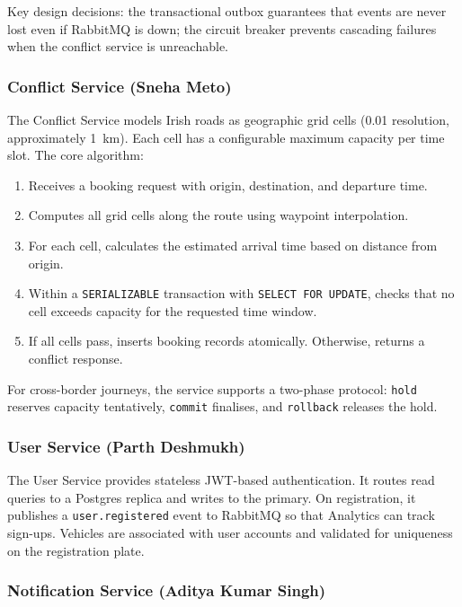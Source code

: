 \documentclass[12pt,a4paper]{article}
\begin{document}
Key design decisions: the transactional outbox guarantees that events are never lost even if RabbitMQ is down; the circuit breaker prevents cascading failures when the conflict service is unreachable.

\subsubsection{Conflict Service (Sneha Meto)}

The Conflict Service models Irish roads as geographic grid cells (0.01\textdegree{} resolution, approximately 1~km). Each cell has a configurable maximum capacity per time slot. The core algorithm:
\begin{enumerate}[nosep]
  \item Receives a booking request with origin, destination, and departure time.
  \item Computes all grid cells along the route using waypoint interpolation.
  \item For each cell, calculates the estimated arrival time based on distance from origin.
  \item Within a \texttt{SERIALIZABLE} transaction with \texttt{SELECT FOR UPDATE}, checks that no cell exceeds capacity for the requested time window.
  \item If all cells pass, inserts booking records atomically. Otherwise, returns a conflict response.
\end{enumerate}

For cross-border journeys, the service supports a two-phase protocol: \texttt{hold} reserves capacity tentatively, \texttt{commit} finalises, and \texttt{rollback} releases the hold.

\subsubsection{User Service (Parth Deshmukh)}

The User Service provides stateless JWT-based authentication. It routes read queries to a Postgres replica and writes to the primary. On registration, it publishes a \texttt{user.registered} event to RabbitMQ so that Analytics can track sign-ups. Vehicles are associated with user accounts and validated for uniqueness on the registration plate.

\subsubsection{Notification Service (Aditya Kumar Singh)}
\end{document}
